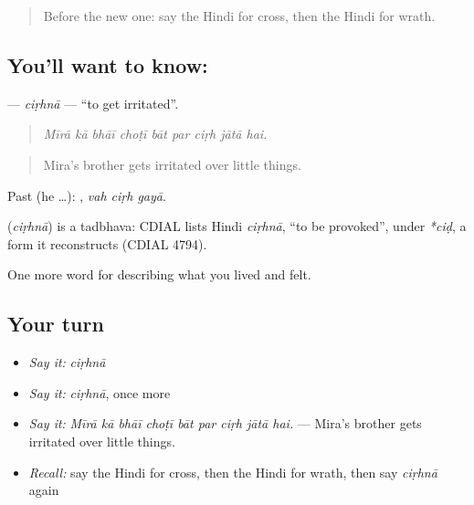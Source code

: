 \begin{quote}
Before the new one: say the Hindi for cross, then the Hindi for wrath.
\end{quote}

\subsection*{You'll want to know: }
\textbf{} — \emph{ciṛhnā} — \textquotedblleft{}to get irritated\textquotedblright{}.

\begin{quote}
        
\end{quote}

\begin{quote}
\emph{Mīrā kā bhāī choṭī bāt par ciṛh jātā hai.}
\end{quote}

\begin{quote}
Mira's brother gets irritated over little things.
\end{quote}

Past (he …):   , \emph{vah ciṛh gayā}.

\begin{cousinweb}
\textbf{} (\emph{ciṛhnā}) is a tadbhava: CDIAL lists Hindi \emph{ciṛhnā}, \textquotedblleft{}to be provoked\textquotedblright{}, under \emph{*ciḍ}, a form it reconstructs (CDIAL 4794).
\end{cousinweb}

\begin{grammarlens}[title={What you've built}]
One more word for describing what you lived and felt.
\end{grammarlens}

\subsection*{Your turn}
\begin{itemize}
\raggedright
  \item \emph{Say it:} \emph{ciṛhnā}
  \item \emph{Say it:} \emph{ciṛhnā}, once more
  \item \emph{Say it:} \emph{Mīrā kā bhāī choṭī bāt par ciṛh jātā hai.} — Mira's brother gets irritated over little things.
  \item \emph{Recall:} say the Hindi for cross, then the Hindi for wrath, then say \emph{ciṛhnā} again
\end{itemize}

